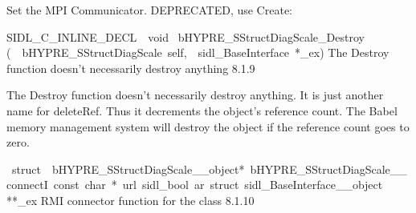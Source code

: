 \documentclass{article}
\begin{document}
\begin{cxxentry}
\begin{cxxentry}
\begin{cxxfunction}
\begin{cxxdoc}
Set the MPI Communicator.
DEPRECATED, use Create:
\end{cxxdoc}
\end{cxxfunction}
\begin{cxxfunction}
{SIDL\_C\_INLINE\_DECL\ \ void\ }
        {bHYPRE\_SStructDiagScale\_Destroy}
        {(\ \ bHYPRE\_SStructDiagScale\ self,\ \ sidl\_BaseInterface\ *\_ex)}
        {
The Destroy function doesn't necessarily destroy anything}
        {8.1.9}
\begin{cxxdoc}

The Destroy function doesn't necessarily destroy anything.
It is just another name for deleteRef.  Thus it decrements the
object's reference count.  The Babel memory management system will
destroy the object if the reference count goes to zero.
\end{cxxdoc}
\end{cxxfunction}
\begin{cxxvariable}
{\ struct\ \ bHYPRE\_SStructDiagScale\_\_object*\ bHYPRE\_SStructDiagScale\_\_connectI\ const\ char\ *\ url\ sidl\_bool\ ar\ struct\ sidl\_BaseInterface\_\_object}
        {**\_ex}
        {}
        {
RMI connector function for the class}
        {8.1.10}
\begin{cxxdoc}


\end{cxxdoc}
\end{cxxvariable}
\end{cxxentry}
\end{cxxentry}
\end{document}
